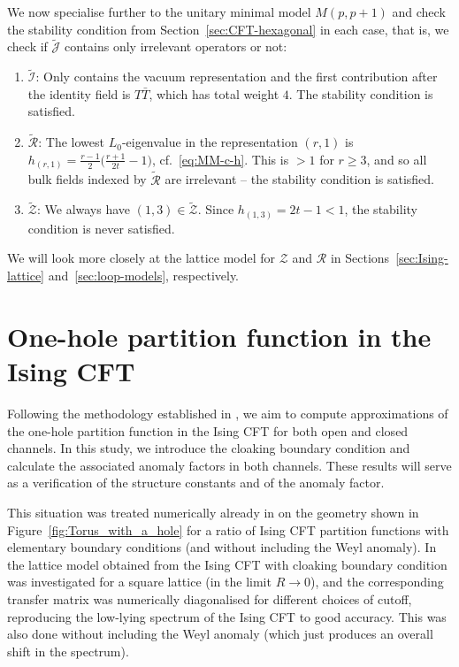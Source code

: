 \documentclass[11pt,a4paper]{article}
\numberwithin{equation}{section}
\begin{document}
We now specialise further to the unitary minimal model $M(p,p+1)$ and check the stability condition from Section~\ref{sec:CFT-hexagonal} in each case, that is, we check if $\widetilde{\mathcal{J}}$ contains only irrelevant operators or not:
\begin{enumerate}
    \item $\widetilde{\mathcal{I}}$: Only contains the vacuum representation and the first contribution after the identity field is $T \bar T$, which has total weight $4$. The stability condition is satisfied.

    \item $\widetilde{\mathcal{R}}$: The lowest $L_0$-eigenvalue in the representation $(r,1)$ is $h_{(r,1)} = \frac{r-1}2 \big(\frac{r+1}{2t}-1\big)$, cf.\ \eqref{eq:MM-c-h}. This is $>1$ for $r \ge 3$, and so all bulk fields indexed by $\widetilde{\mathcal{R}}$ are irrelevant -- the stability condition is satisfied.

    \item $\widetilde{\mathcal{Z}}$: We always have $(1,3) \in \widetilde{\mathcal{Z}}$. Since $h_{(1,3)} = 2t-1 < 1$, the stability condition is never satisfied.    
\end{enumerate}
We will look more closely at the lattice model for $\mathcal{Z}$ and $\mathcal{R}$ in Sections~\ref{sec:Ising-lattice} and~\ref{sec:loop-models}, respectively.


\section{One-hole partition function in the Ising CFT}\label{sec:one-hole-comparison}

Following the methodology established in \cite{Brehm:2021wev}, we aim to compute approximations of the one-hole partition function in the Ising CFT for both open and closed channels. In this study, we introduce the cloaking boundary condition and calculate the associated anomaly factors in both channels. These results will serve as a verification of the structure constants and of the anomaly factor. 

This situation was treated numerically already in \cite{Brehm:2021wev} on the geometry shown in Figure~\ref{fig:Torus_with_a_hole} for a ratio of Ising CFT partition functions with elementary boundary conditions (and without including the Weyl anomaly). In \cite{Cheng:2023kxh} the lattice model obtained from the Ising CFT with cloaking boundary condition was investigated for a square lattice (in the limit $R \to 0$), and the corresponding transfer matrix was numerically diagonalised for different choices of cutoff, reproducing the low-lying spectrum of the Ising CFT to good accuracy. This was also done without including the Weyl anomaly (which just produces an overall shift in the spectrum).
\end{document}
